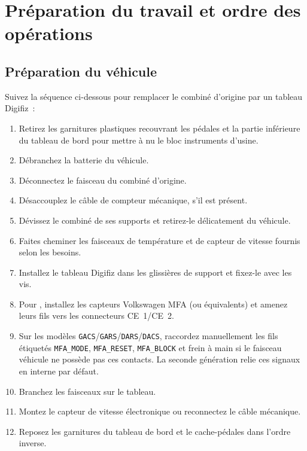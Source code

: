\chapter{Préparation du travail et ordre des opérations}\label{ch:preparation}

\section{Préparation du véhicule}
Suivez la séquence ci-dessous pour remplacer le combiné d'origine par un tableau Digifiz~:
\begin{enumerate}
    \item Retirez les garnitures plastiques recouvrant les pédales et la partie inférieure du tableau de bord pour mettre à nu le bloc instruments d'usine.
    \item Débranchez la batterie du véhicule.
    \item Déconnectez le faisceau du combiné d'origine.
    \item Désaccouplez le câble de compteur mécanique, s'il est présent.
    \item Dévissez le combiné de ses supports et retirez-le délicatement du véhicule.
    \item Faites cheminer les faisceaux de température et de capteur de vitesse fournis selon les besoins.
    \item Installez le tableau Digifiz dans les glissières de support et fixez-le avec les vis.
    \item Pour \ReplicaNextLong{}, installez les capteurs Volkswagen MFA (ou équivalents) et amenez leurs fils vers les connecteurs CE~1/CE~2.
    \item Sur les modèles \texttt{GACS}/\texttt{GARS}/\texttt{DARS}/\texttt{DACS}, raccordez manuellement les fils étiquetés \texttt{MFA\_MODE}, \texttt{MFA\_RESET}, \texttt{MFA\_BLOCK} et frein à main si le faisceau véhicule ne possède pas ces contacts. La seconde génération \ReplicaNextShort{} relie ces signaux en interne par défaut.
    \item Branchez les faisceaux sur le tableau.
    \item Montez le capteur de vitesse électronique ou reconnectez le câble mécanique.
    \item Reposez les garnitures du tableau de bord et le cache-pédales dans l'ordre inverse.
\end{enumerate}

